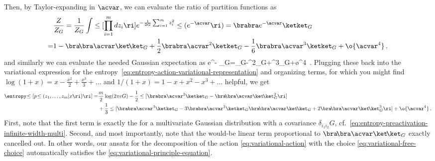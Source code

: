 Then, by Taylor-expanding in $\acvar$, we can evaluate the ratio of partition functions as
\begin{align}\label{eq:variational-evaluation}
&\frac{Z}{Z_{G}}=\frac{1}{Z_{G}} \int\le[\prod_{i=1}^{m}dz_i\ri] e^{-\frac{1}{2G}\sum_{i=1}^{m}z_{i}^2}\le(e^{-\acvar} \ri)=\brabra e^{-\acvar}\ketket_{G}\, \\
=&1-\bra\!\bra \acvar\ket\!\ket_{G}+\frac{1}{2}\brabra \acvar^2\ketket_{G}-\frac{1}{6}\brabra \acvar^3\ketket_{G}+\o{\acvar^4}\, ,\notag
\end{align}
and similarly we can evaluate the needed Gaussian expectation as
\be
\brabra e^{-\acvar} \acvar\ketket_{G}=\bra\!\bra \acvar\ket\!\ket_{G}-\brabra \acvar^2\ketket_{G}+\brabra \acvar^3\ketket_{G}+\o{\acvar^4}\, .
\ee
Plugging these back into the variational expression for the entropy~\eqref{eq:entropy-action-variational-representation} and organizing terms, for which you might find $\log(1+x)=x-\frac{x^2}{2}+\frac{x^3}{3}+\ldots$ and $1/(1+x)=1-x+x^2-x^3+\ldots$ helpful,  we get
\begin{align}\label{eq:entropy-action-variational-representation-practical}
\entropy\!\le[p\!\le(z_1,\ldots, z_{m}\vert x\ri)\ri]=&\frac{m}{2}\log(2\pi e G)-\frac{1}{2}\le[\brabra \acvar^2\ketket_{G}-\bra\!\bra \acvar\ket\!\ket_{G}^2\ri]\, \\
&+\frac{1}{3}\le[\brabra \acvar^3\ketket_{G}-3\brabra \acvar^2\ketket_{G}\bra\!\bra \acvar\ket\!\ket_{G}+2\bra\!\bra \acvar\ket\!\ket_{G}^3\ri]+\o{\acvar^4} \, .\notag
\end{align}
First, note that the first term is exactly the   for a multivariate Gaussian distribution with a covariance $\delta_{i_1i_2}G$, cf.~\eqref{eq:entropy-preactivation-infinite-width-multi}.  Second, and most importantly, note that the would-be linear term proportional to $\bra\!\bra \acvar\ket\!\ket_{G}$ exactly cancelled out. In other words, our ansatz for the decomposition of the action \eqref{eq:variational-action}  with the choice \eqref{eq:variational-free-choice} automatically satisfies the  \eqref{eq:variational-principle-equation}.


